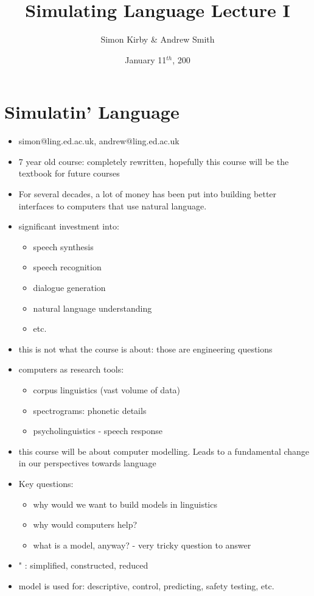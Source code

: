\documentclass[11pt]{amsart}
\title{Simulating Language Lecture I}
\author{Simon Kirby \& Andrew Smith}
\date{January 11$^{th}$, 200}                                           %
\begin{document}
\maketitle
\section{Simulatin' Language}
\begin{itemize}
\item simon@ling.ed.ac.uk, andrew@ling.ed.ac.uk
\item 7 year old course: completely rewritten, hopefully this course will be the textbook for future courses
\item For several decades, a lot of money has been put into building better interfaces to computers that use natural language.
\item significant investment into: \begin{itemize}
\item speech synthesis
\item speech recognition
\item dialogue generation
\item natural language understanding
\item etc.
\end{itemize}
\item this is not what the course is about: those are engineering questions
\item computers as research tools: \begin{itemize}
\item corpus linguistics (vast volume of data)
\item spectrograms: phonetic details
\item psycholinguistics - speech response
\end{itemize}
\item this course will be about computer modelling. Leads to a fundamental change in our perspectives towards language
\item Key questions: \begin{itemize}
\item why would we want to build models in linguistics
\item why would computers help?
\item what is a model, anyway? - very tricky question to answer \end{itemize}
\item " :  simplified, constructed, reduced
\item model is used for: descriptive, control, predicting, safety testing, etc.

\end{itemize}
\end{document}
